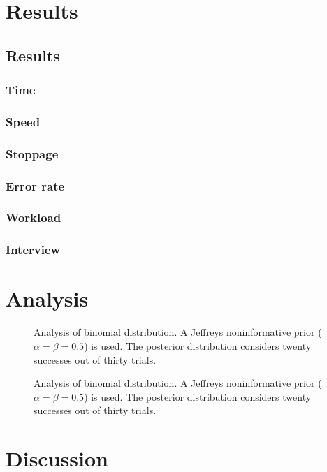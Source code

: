 \chapter{Results}
\label{ch:results}
\section{Results}
  \subsection{Time}
  \subsection{Speed}
  \subsection{Stoppage}
  \subsection{Error rate}
  \subsection{Workload}
  \subsection{Interview}
\chapter{Analysis}
\begin{figure}[h]
  \centering
  \ifdraft{}{}
  \caption[Overall result curve]{Analysis of binomial distribution. A Jeffreys noninformative prior ($\alpha = \beta = 0.5$) is used. The posterior distribution considers twenty successes out of thirty trials.}
  \label{fig:paths_overview}
\end{figure}
\begin{figure}[h]
  \centering
  \ifdraft{}{}
  \caption[Overall result curve]{Analysis of binomial distribution. A Jeffreys noninformative prior ($\alpha = \beta = 0.5$) is used. The posterior distribution considers twenty successes out of thirty trials.}
  \label{fig:paths_detailed.pgf}
\end{figure}
\chapter{Discussion}
